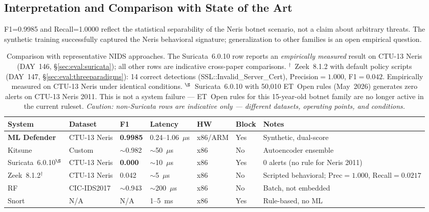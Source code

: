 \documentclass[11pt,a4paper]{article}
\begin{document}
    \subsection{Interpretation and Comparison with State of the Art}
    \label{sec:eval:interpretation}

    F1=0.9985 and Recall=1.0000 reflect the statistical separability of the Neris botnet
    scenario, not a claim about arbitrary threats. The synthetic training successfully captured
    the Neris behavioral signature; generalization to other families is an open empirical
    question.

    \begin{table}[h]
        \centering
        \footnotesize
        \caption{Comparison with representative NIDS approaches. The Suricata~6.0.10 row reports
        an \emph{empirically measured} result on CTU-13 Neris (DAY~146,
            \S\ref{sec:eval:suricata}); all other rows are indicative cross-paper comparisons.
            $^{\dagger}$~Zeek~8.1.2 with default policy scripts (DAY~147, \S\ref{sec:eval:threeparadigms}): 14 correct detections (SSL::Invalid\_Server\_Cert), Precision$=1.000$, F1$=0.042$. Empirically measured on CTU-13 Neris under identical conditions.
            $^{\S}$~Suricata~6.0.10 with 50,010 ET~Open rules (May~2026) generates zero alerts on
            CTU-13 Neris 2011. This is not a system failure --- ET~Open rules for this 15-year-old
            botnet family are no longer active in the current ruleset. \emph{Caution: non-Suricata
            rows are indicative only --- different datasets, operating points, and conditions.}}
        \label{tab:comparison}
        \begin{tabular}{lllllll}
            \toprule
            \textbf{System} & \textbf{Dataset} & \textbf{F1} & \textbf{Latency} & \textbf{HW} & \textbf{Block} & \textbf{Notes} \\
            \midrule
            \textbf{ML Defender} & CTU-13 Neris & \textbf{0.9985} & 0.24--1.06~$\mu$s & x86/ARM & Yes & Synthetic, dual-score \\
            Kitsune~\cite{mirsky2018} & Custom & ${\sim}$0.982 & ${\sim}$50~$\mu$s & x86 & No & Autoencoder ensemble \\
            Suricata~6.0.10$^{\S}$ & CTU-13 Neris & \textbf{0.000} & ${\sim}$10~$\mu$s & x86 & Yes & 0 alerts (no rule for Neris 2011) \\
            Zeek~8.1.2$^{\dagger}$ & CTU-13 Neris & 0.042 & ${\sim}$5~$\mu$s & x86 & No & Scripted behavioral; Prec$=1.000$, Recall$=0.0217$ \\
            RF~\cite{sharafaldin2018} & CIC-IDS2017 & ${\sim}$0.943 & ${\sim}$200~$\mu$s & x86 & No & Batch, not embedded \\
            Snort & N/A & N/A & 1--5~ms & x86 & Yes & Rule-based, no ML \\
            \bottomrule
        \end{tabular}
    \end{table}
\end{document}
